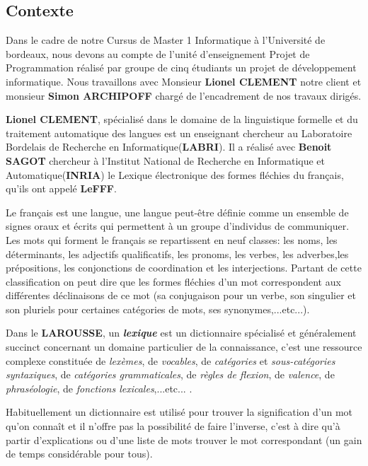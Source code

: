 \documentclass[a4paper, 12pt]{article}
\begin{document}
\subsection{Contexte}
Dans le cadre de notre Cursus de Master 1 Informatique à l'Université de bordeaux, nous devons au compte de l'unité d'enseignement Projet de Programmation réalisé par groupe de cinq étudiants un projet de développement informatique. Nous travaillons avec Monsieur \textbf{Lionel CLEMENT} notre client et monsieur \textbf{Simon ARCHIPOFF} chargé de l'encadrement de nos travaux dirigés.


{\textbf{Lionel CLEMENT}, spécialisé dans le domaine de la linguistique formelle et du traitement automatique des langues est un enseignant chercheur au Laboratoire Bordelais de Recherche en Informatique(\textbf{LABRI}). Il a réalisé avec \textbf{Benoit SAGOT} \cite{lefff_int} chercheur à l'Institut National de Recherche en Informatique et Automatique(\textbf{INRIA})  le Lexique électronique des formes fléchies du français, qu'ils ont appelé \textbf{LeFFF}\cite{tagset}\cite{lefff}.\par}
{Le français est une langue, une langue peut-être définie comme un ensemble de signes oraux et écrits qui permettent à un groupe d'individus de communiquer. Les mots qui forment le français se repartissent en neuf classes: les noms, les déterminants, les adjectifs qualificatifs, les pronoms, les verbes, les adverbes,les prépositions, les conjonctions de coordination et les interjections. Partant de cette classification on peut dire que les formes fléchies d'un mot correspondent aux différentes déclinaisons de ce mot (sa conjugaison pour un verbe, son singulier et son pluriels pour certaines catégories de mots, ses synonymes,...etc...).\par}
{Dans le \textbf{LAROUSSE}, un \textit{\bf lexique} est un dictionnaire spécialisé et généralement succinct concernant un domaine particulier de la connaissance, c'est une ressource complexe constituée de \textit{lexèmes}, de \textit{vocables}, de \textit{catégories} et \textit{sous-catégories syntaxiques}, de \textit{catégories grammaticales}, de \textit{règles de flexion}, de \textit{valence}, de \textit{phraséologie}, de \textit{fonctions lexicales},...etc... .\par}

{Habituellement un dictionnaire est utilisé pour trouver la signification d'un mot qu'on connaît et il n'offre pas la possibilité de faire l'inverse, c'est à dire qu'à partir d'explications ou d'une liste de mots trouver le mot correspondant (un gain de temps considérable pour tous).\par}
\end{document}
